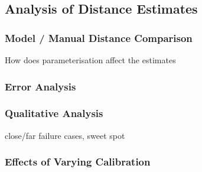 \subsection{Analysis of Distance Estimates}

\subsubsection{Model / Manual Distance Comparison}

How does parameterisation affect the estimates

\subsubsection{Error Analysis}

\subsubsection{Qualitative Analysis}
close/far failure cases, sweet spot

\subsubsection{Effects of Varying Calibration}